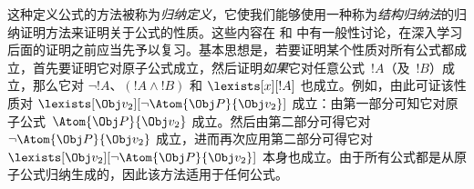 \documentclass[../../../include/open-logic-section]{subfiles}
\begin{document}
这种定义公式的方法被称为\emph{归纳定义}，它使我们能够使用一种称为\emph{结构归纳法}的归纳证明方法来证明关于公式的性质。这些内容在  和  中有一般性讨论，在深入学习后面的证明之前应当先予以复习。基本思想是，若要证明某个性质对所有公式都成立，首先要证明它对原子公式成立，然后证明\emph{如果}它对任意公式~$!A$（及~$!B$）成立，那么它对 $\lnot !A$、$(!A \land !B)$ 和 $\lexists[x][!A]$ 也成立。例如，由此可证该性质对 $\lexists[\Obj v_2][\lnot \Atom{\Obj P}{\Obj v_2}]$ 成立：由第一部分可知它对原子公式~$\Atom{\Obj
P}{\Obj v_2}$ 成立。然后由第二部分可得它对 $\lnot \Atom{\Obj
P}{\Obj v_2}$ 成立，进而再次应用第二部分可得它对 $\lexists[\Obj v_2][\lnot \Atom{\Obj P}{\Obj v_2}]$ 本身也成立。由于所有公式都是从原子公式归纳生成的，因此该方法适用于任何公式。
\end{document}
